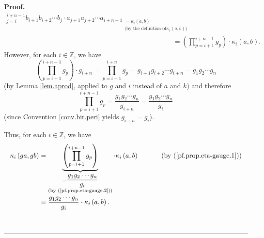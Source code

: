 \documentclass[numbers=enddot,12pt,final,onecolumn,notitlepage]{scrartcl}%
\theoremstyle{definition}
\newenvironment{proof}[1][Proof]{\noindent\textbf{#1.} }{\ \rule{0.5em}{0.5em}}
\let\prodnonlimits\prod
\renewcommand{\prod}{\prodnonlimits\limits}
\newenvironment{verlong}{}{}
\begin{document}
\begin{verlong}
\begin{proof}
\begin{align}
{_{j=i}^{i+n-1}b_{i+1}b_{i+2}\cdots b_{j}\cdot a_{j+1}a_{j+2}\cdots a_{i+n-1}%
}_{\substack{=\kappa_{i}\left(  a,b\right)  \\\text{(by the definition of
}\kappa_{i}\left(  a,b\right)  \text{)}}}\nonumber\\
& =\left(  \prod_{p=i+1}^{i+n-1}g_{p}\right)  \cdot\kappa_{i}\left(
a,b\right)  .\label{pf.prop.eta-gauge.1}%
\end{align}
However, for each $i\in\mathbb{Z}$, we have%
\[
\left(  \prod_{p=i+1}^{i+n-1}g_{p}\right)  \cdot g_{i+n}=\prod_{p=i+1}%
^{i+n}g_{p}=g_{i+1}g_{i+2}\cdots g_{i+n}=g_{1}g_{2}\cdots g_{n}%
\]
(by Lemma \ref{lem.aprod}, applied to $g$ and $i$ instead of $a$ and $k$) and
therefore%
\begin{equation}
\prod_{p=i+1}^{i+n-1}g_{p}=\dfrac{g_{1}g_{2}\cdots g_{n}}{g_{i+n}}%
=\dfrac{g_{1}g_{2}\cdots g_{n}}{g_{i}}\label{pf.prop.eta-gauge.2}%
\end{equation}
(since Convention \ref{conv.bir.peri} yields $g_{i+n}=g_{i}$). 

Thus, for each $i\in\mathbb{Z}$, we have
\begin{align}
\kappa_{i}\left(  ga,gb\right)    & =\underbrace{\left(  \prod_{p=i+1}%
^{i+n-1}g_{p}\right)  }_{\substack{=\dfrac{g_{1}g_{2}\cdots g_{n}}{g_{i}%
}\\\text{(by (\ref{pf.prop.eta-gauge.2}))}}}\cdot\kappa_{i}\left(  a,b\right)
\ \ \ \ \ \ \ \ \ \ \left(  \text{by (\ref{pf.prop.eta-gauge.1})}\right)
\nonumber\\
& =\dfrac{g_{1}g_{2}\cdots g_{n}}{g_{i}}\cdot\kappa_{i}\left(  a,b\right)
.\label{pf.prop.eta-gauge.3}%
\end{align}



\end{proof}
\end{verlong}
\end{document}

